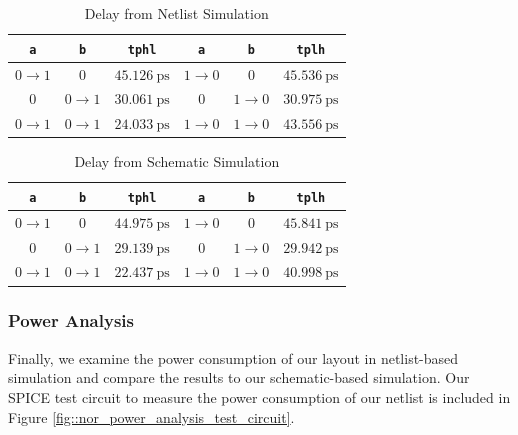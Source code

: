 \documentclass{article}
\begin{document}
	\begin{table}[H]
	\begin{center}
	\caption{Delay from Netlist Simulation}
	\label{table::nor_gate_delay_analysis}
	\begin{tabular}{| c | c | c || c | c | c |}
		\hline
		\texttt{a} & \texttt{b} & \texttt{tphl} & \texttt{a} & \texttt{b} & \texttt{tplh} \\
		\hline	
		$0 \rightarrow 1$ & $0$ & $45.126\ \text{ps}$ & $1 \rightarrow 0$ & $0$ & $45.536\ \text{ps}$\\
		\hline	
		$0$ & $0 \rightarrow 1$ & $30.061\ \text{ps}$ & $0$ & $1 \rightarrow 0$ & $30.975\ \text{ps}$\\
		\hline	
		$0 \rightarrow 1$ & $0 \rightarrow 1$ & $24.033\ \text{ps}$ & $1 \rightarrow 0$ & $1 \rightarrow 0$ & $43.556\ \text{ps}$\\
		\hline
	\end{tabular}
	\end{center}
	\end{table}
	
	\begin{table}[H]
	\begin{center}
	\caption{Delay from Schematic Simulation}
	\label{table::nor_gate_delay_analysis_schem}
	\begin{tabular}{| c | c | c || c | c | c |}
		\hline
		\texttt{a} & \texttt{b} & \texttt{tphl} & \texttt{a} & \texttt{b} & \texttt{tplh} \\
		\hline	
		$0 \rightarrow 1$ & $0$ & $44.975\ \text{ps}$ & $1 \rightarrow 0$ & $0$ & $45.841\ \text{ps}$\\
		\hline	
		$0$ & $0 \rightarrow 1$ & $29.139\ \text{ps}$ & $0$ & $1 \rightarrow 0$ & $29.942\ \text{ps}$\\
		\hline	
		$0 \rightarrow 1$ & $0 \rightarrow 1$ & $22.437\ \text{ps}$ & $1 \rightarrow 0$ & $1 \rightarrow 0$ & $40.998\ \text{ps}$\\
		\hline
	\end{tabular}
	\end{center}
	\end{table}
	
	\subsubsection{Power Analysis}
	
	Finally, we examine the power consumption of our layout in netlist-based simulation and compare the results to our schematic-based simulation. Our SPICE test circuit to measure the power consumption of our netlist is included in Figure \ref{fig::nor_power_analysis_test_circuit}.
	
\end{document}
